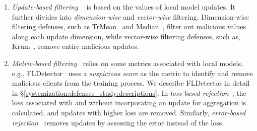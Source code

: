 \begin{enumerate}[leftmargin=*, label=\alph*), wide]
    \item \emph{Update-based filtering ~\cite{yin2018byzantine, blanchard2017machine, pillutla2019robust}} is based on the values of local model updates. It further divides into \emph{dimension-wise} and \emph{vector-wise} filtering. Dimension-wise filtering defenses, such as TrMean~\cite{yin2018byzantine} and Median~\cite{yin2018byzantine}, filter out malicious values along each update dimension, while vector-wise filtering defenses, such as, Krum~\cite{blanchard2017machine}, remove entire malicious updates.
    \item \emph{Metric-based filtering~\cite{ranjan2022securing, jebreel2022defending, fang2020local, zhang2022fldetector}} relies on some metrics associated with local models, e.g., FLDetector~\cite{zhang2022fldetector} uses a \emph{suspicious score} as the metric to identify and remove malicious clients from the training process. We describe FLDetector in detail in \S\ref{systemization:defenses_study:descriptions}. In \emph{loss-based rejection}~\cite{fang2020local}, the loss associated with and without incorporating an update for aggregation is calculated, and updates with higher loss are removed. Similarly, \emph{error-based rejection}~\cite{fang2020local} removes updates by assessing the error instead of the loss.
\end{enumerate}

